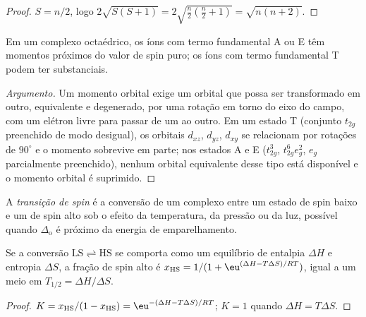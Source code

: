 \begin{proof}
$S = n/2$, logo $2\sqrt{S(S+1)} = 2\sqrt{\frac n2(\frac n2 + 1)} = \sqrt{n(n+2)}$.
\end{proof}

\begin{proposition}\label{prop:b3:complex-spectra-magnetism:orbital-contribution}
Em um complexo octaédrico, os íons com termo fundamental A ou E têm momentos próximos
do valor de spin puro; os íons com termo fundamental T podem ter  substanciais.
\end{proposition}

\begin{proof}[Argumento]
Um momento orbital exige um orbital que possa ser transformado em outro, equivalente e
degenerado, por uma rotação em torno do eixo do campo, com um elétron livre para
passar de um ao outro. Em um estado T (conjunto $t_{2g}$ preenchido de modo desigual), os
orbitais $d_{xz}$, $d_{yz}$, $d_{xy}$ se relacionam por rotações de $90^\circ$ e o momento sobrevive em
parte; nos estados A e E ($t_{2g}^3$, $t_{2g}^6e_g^2$, $e_g$ parcialmente preenchido), nenhum orbital
equivalente desse tipo está disponível e o momento orbital é suprimido.
\end{proof}

\begin{definition}\label{def:b3:complex-spectra-magnetism:spin-crossover}
A \emph{transição de spin} é a conversão de um complexo
entre um estado de spin baixo e um de spin alto sob o efeito da temperatura, da
pressão ou da luz, possível quando $\Delta_{\mathrm o}$ é próximo da energia de emparelhamento.
\end{definition}

\begin{proposition}\label{prop:b3:complex-spectra-magnetism:crossover}
Se a conversão $\mathrm{LS} \rightleftharpoons \mathrm{HS}$ se comporta como um equilíbrio de entalpia $\Delta H$ e entropia $\Delta S$, a
fração de spin alto é $x_{\mathrm{HS}} = 1/(1 + \eu^{(\Delta H - T\Delta S)/RT})$, igual a um meio em $T_{1/2} = \Delta H/\Delta S$.
\end{proposition}

\begin{proof}
$K = x_{\mathrm{HS}}/(1 - x_{\mathrm{HS}}) = \eu^{-(\Delta H - T\Delta S)/RT}$; $K = 1$ quando $\Delta H = T\Delta S$.
\end{proof}

